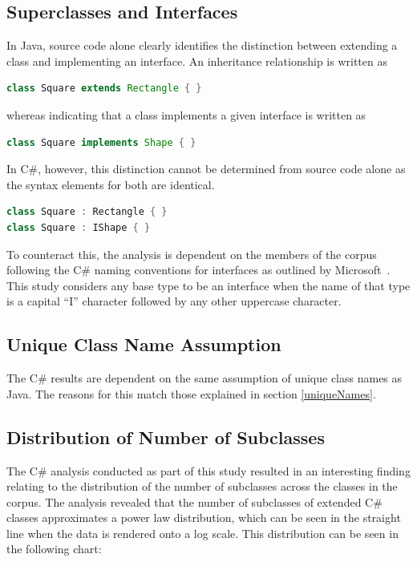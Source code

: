 \subsection{Superclasses and Interfaces}
\label{interfaceNaming}
In Java, source code alone clearly identifies the distinction between extending a class and implementing an interface. An inheritance relationship is written as
\begin{lstlisting}[language=java]
class Square extends Rectangle { }
\end{lstlisting}
whereas indicating that a class implements a given interface is written as
\begin{lstlisting}[language=java]
class Square implements Shape { }
\end{lstlisting}
In C\#, however, this distinction cannot be determined from source code alone as the syntax elements for both are identical.
\begin{lstlisting}[language=cs]
class Square : Rectangle { }
class Square : IShape { }
\end{lstlisting}
To counteract this, the analysis is dependent on the members of the corpus following the C\# naming conventions for interfaces as outlined by Microsoft~\cite{InterfaceNaming}. This study considers any base type to be an interface when the name of that type is a capital ``I'' character followed by any other uppercase character.

\subsection{Unique Class Name Assumption}
The C\# results are dependent on the same assumption of unique class names as Java. The reasons for this match those explained in section \ref{uniqueNames}.

\subsection{Distribution of Number of Subclasses}
The C\# analysis conducted as part of this study resulted in an interesting finding relating to the distribution of the number of subclasses across the classes in the corpus. The analysis revealed that the number of subclasses of extended C\# classes approximates a power law distribution, which can be seen in the straight line when the data is rendered onto a log scale. This distribution can be seen in the following chart:



